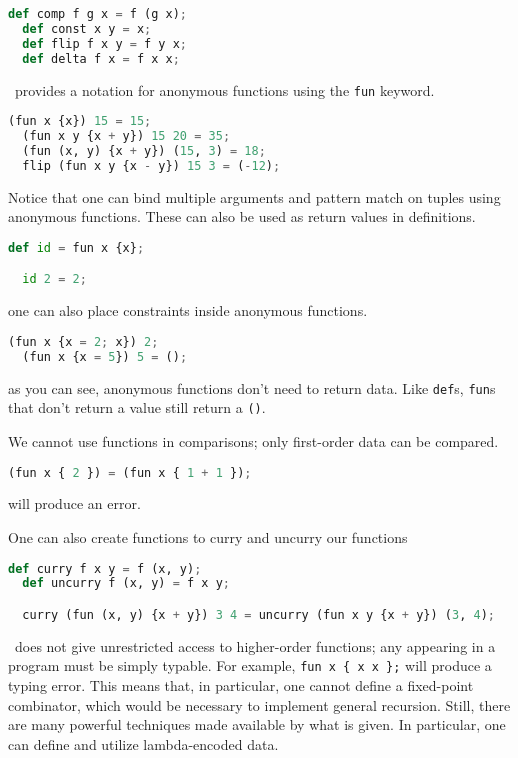\begin{lstlisting}[language=Python]
  def comp f g x = f (g x);
  def const x y = x;
  def flip f x y = f y x;
  def delta f x = f x x;
\end{lstlisting}

\vampir\ provides a notation for anonymous functions using the \lstinline{fun} keyword.

\begin{lstlisting}[language=Python]
  (fun x {x}) 15 = 15;
  (fun x y {x + y}) 15 20 = 35;
  (fun (x, y) {x + y}) (15, 3) = 18;
  flip (fun x y {x - y}) 15 3 = (-12);
\end{lstlisting}

Notice that one can bind multiple arguments and pattern match on tuples using anonymous functions. These can also be used as return values in definitions.

\begin{lstlisting}[language=Python]
  def id = fun x {x};

  id 2 = 2;
\end{lstlisting}

one can also place constraints inside anonymous functions.

\begin{lstlisting}[language=Python]
  (fun x {x = 2; x}) 2;
  (fun x {x = 5}) 5 = ();
\end{lstlisting}

as you can see, anonymous functions don't need to return data. Like \lstinline{def}s, \lstinline{fun}s that don't return a value still return a \lstinline{()}.

We cannot use functions in comparisons; only first-order data can be compared. 

\begin{lstlisting}[language=Python]
  (fun x { 2 }) = (fun x { 1 + 1 });
\end{lstlisting}

will produce an error.

One can also create functions to curry and uncurry our functions

\begin{lstlisting}[language=Python]
  def curry f x y = f (x, y);
  def uncurry f (x, y) = f x y;

  curry (fun (x, y) {x + y}) 3 4 = uncurry (fun x y {x + y}) (3, 4);
\end{lstlisting}

\vampir\ does not give unrestricted access to higher-order functions; any appearing in a program must be simply typable. For example, \lstinline|fun x { x x };| will produce a typing error. This means that, in particular, one cannot define a fixed-point combinator, which would be necessary to implement general recursion. Still, there are many powerful techniques made available by what is given. In particular, one can define and utilize lambda-encoded data.

